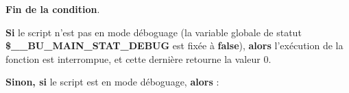 \documentclass[a4paper,10pt]{article}
\begin{document}
\begin{justify}
    \textbf{\color{brick}Fin de la condition}.
\end{justify}\setlength{\parskip}{2em}


\begin{justify}
    \textbf{\color{brick}Si} le script n'est pas en mode déboguage (la variable globale de statut \textbf{\color{orange}\$\_\_BU\_MAIN\_STAT\_DEBUG} est fixée à \textbf{false}), \textbf{\color{brick}alors} l'exécution de la fonction est interrompue, et cette dernière retourne la valeur 0.
\end{justify}\setlength{\parskip}{1em}

\begin{justify}
    \textbf{\color{brick}Sinon, si} le script est en mode déboguage, \textbf{\color{brick}alors} :
\end{justify}
\end{document}
